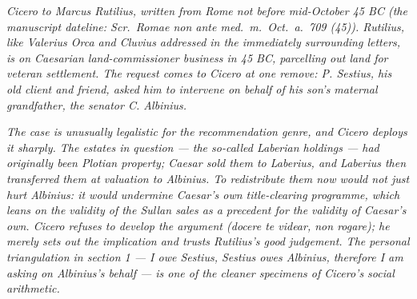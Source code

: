 
\textit{Cicero to Marcus Rutilius, written from Rome not
before mid-October 45 BC (the manuscript dateline:
\textit{Scr.\ Romae non ante med.\ m.\ Oct.\ a.\ 709
(45)}). Rutilius, like Valerius Orca and Cluvius
addressed in the immediately surrounding letters, is on
Caesarian land-commissioner business in 45 BC, parcelling
out land for veteran settlement. The request comes to
Cicero at one remove: P. Sestius, his old client and
friend, asked him to intervene on behalf of his son's
maternal grandfather, the senator C. Albinius.}

\textit{The case is unusually legalistic for the
recommendation genre, and Cicero deploys it sharply. The
estates in question --- the so-called Laberian holdings
--- had originally been Plotian property; Caesar sold
them to Laberius, and Laberius then transferred them at
valuation to Albinius. To redistribute them now would not
just hurt Albinius: it would undermine Caesar's own
title-clearing programme, which leans on the validity of
the Sullan sales as a precedent for the validity of
Caesar's own. Cicero refuses to develop the argument
(\textit{docere te videar, non rogare}); he merely sets
out the implication and trusts Rutilius's good judgement.
The personal triangulation in section 1 --- I owe
Sestius, Sestius owes Albinius, therefore I am asking on
Albinius's behalf --- is one of the cleaner specimens of
Cicero's social arithmetic.}
